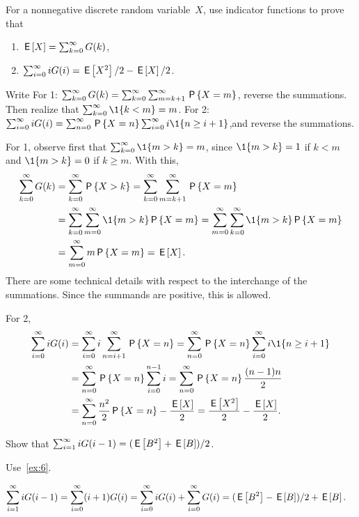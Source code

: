 \documentclass[stochastic-or.tex]{subfiles}
\begin{document}
\begin{extra}\label{ex:6}
 For a nonnegative discrete random variable~$X$, use indicator functions to prove that
 \begin{enumerate}
 \item  $\E X = \sum_{k=0}^\infty G(k)$,
 \item $\sum_{i=0}^\infty i G(i) = \E{X^2}/2 - \E{X}/2$.
 \end{enumerate}
\begin{hint}
Write
For 1: $\sum_{k=0}^\infty G(k) = \sum_{k=0}^\infty \sum_{m=k+1}^\infty \P{X=m}$, reverse the summations. Then realize that $\sum_{k=0}^\infty \1{k<m} = m$. For 2:
$\sum_{i=0}^\infty i G(i) = \sum_{n=0}^\infty \P{X=n} \sum_{i=0}^\infty i \1{n\geq i+1}$,and reverse the summations.
\end{hint}
\begin{solution}
For 1, observe first that $\sum_{k=0}^\infty \1{m>k} = m$, since $\1{m>k}=1$ if $k<m$ and $\1{m>k} = 0$ if $k\geq m$. With this,
\begin{align*}
\sum_{k=0}^\infty G(k)
&= \sum_{k=0}^\infty \P{X>k}
= \sum_{k=0}^\infty \sum_{m=k+1}^\infty \P{X=m} \\
& = \sum_{k=0}^\infty \sum_{m=0}^\infty \1{m>k} \P{X=m}
= \sum_{m=0}^\infty \sum_{k=0}^\infty \1{m>k} \P{X=m} \\
&= \sum_{m=0}^\infty m\P{X=m} = \E X.
\end{align*}
There are some technical details with respect to the interchange of the summations.
Since the summands are positive, this is allowed.

For 2,
\begin{align*}
\sum_{i=0}^\infty i G(i)
&= \sum_{i=0}^\infty i \sum_{n=i+1}^\infty \P{X=n} = \sum_{n=0}^\infty \P{X=n} \sum_{i=0}^\infty i \1{n\geq i+1} \\
&= \sum_{n=0}^\infty \P{X=n} \sum_{i=0}^{n-1}i = \sum_{n=0}^\infty \P{X=n} \frac{(n-1)n}{2} \\
&= \sum_{n=0}^\infty \frac{n^2}{2} \P{X=n} - \frac{\E X}{2}
= \frac{\E{X^2}}{2} - \frac{\E X}{2}.
\end{align*}
\end{solution}
\end{extra}

\begin{extra}\label{ex:ER}
 Show that $\sum_{i=1}^\infty i G(i-1)= ({\E{B^2} + \E B})/{2}$.
\begin{hint}
 Use~\cref{ex:6}.
\end{hint}
\begin{solution}
\begin{equation*}
 \begin{split}
 \sum_{i=1}^\infty i G(i-1)
&=\sum_{i=0}^\infty (i+1) G(i)
=\sum_{i=0}^\infty i G(i) +
\sum_{i=0}^\infty G(i)= (\E{B^2} - \E B)/2 + \E B.
 \end{split}
\end{equation*}
\end{solution}
\end{extra}
\end{document}
